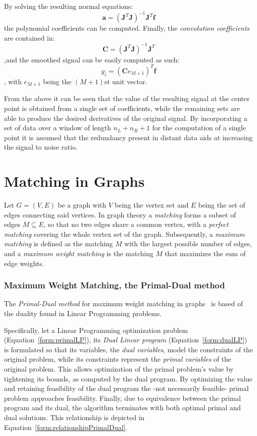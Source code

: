 By solving the resulting normal equations: $$\mathbf{a}=(\mathbf{J}^T \mathbf{J})^{-1} \mathbf{J}^T \mathbf{f}$$ the polynomial coefficients can be computed.
Finally, the \emph{convolution coefficients} are contained in:
$$\mathbf{C}=(\mathbf{J}^T \mathbf{J})^{-1} \mathbf{J}^T$$
,and the smoothed signal can be easily computed as such:
$$g_i=(\mathbf{C} e_{M+1})^T \mathbf{f}$$
, with $e_{M+1}$ being the $(M+1)$st unit vector.

From the above it can be seen that the value of the resulting signal at the center point is obtained from a single set of coefficients, while the remaining sets are able to produce the desired derivatives of the original signal. By incorporating a set of data over a window of length $n_L+n_R+1$ for the computation of a single point it is assumed that the redundancy present in distant data aids at increasing the signal to noise ratio.

\section{Matching in Graphs} \label{sec:theorBack-MWMGraphs}

Let $G=(V,E)$ be a graph with $V$ being the vertex set and $E$ being the set of edges connecting said vertices. In graph theory a \emph{matching} forms a subset of edges $M\subseteq E$, so that no two edges share a common vertex, with a \emph{perfect matching} covering the whole vertex set of the graph. Subsequently, a \emph{maximum matching} is defined as the matching $M$ with the largest possible number of edges, and a \emph{maximum weight matching} is the matching $M$ that maximizes the sum of edge weights. 



\subsubsection{Maximum Weight Matching, the Primal-Dual method}

The \emph{Primal-Dual method} for maximum weight matching in graphs~\cite{EdmondsMatching} is based of the duality found in Linear Programming problems.

Specifically, let a Linear Programming optimization problem (Equation~\ref{form:primalLP}), its \emph{Dual Linear program} (Equation~\ref{form:dualLP}) is formulated so that its variables, the \emph{dual variables}, model the constraints of the original problem, while its constraints represent the \emph{primal variables} of the original problem. This allows optimization of the primal problem's value by tightening its bounds, as computed by the dual program. By optimizing the value and retaining feasibility of the dual program the -not necessarily feasible- primal problem approaches feasibility. Finally, due to equivalence between the primal program and its dual, the algorithm terminates with both optimal primal and dual solutions. This relationship is depicted in Equation~\ref{form:relationshipPrimalDual}.

